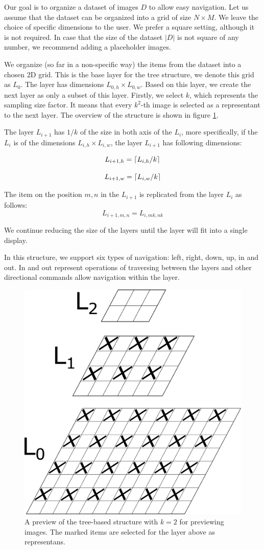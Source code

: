 Our goal is to organize a dataset of images $D$ to allow easy navigation. Let us assume that the dataset can be organized into a grid of size $N\times M$. We leave the choice of specific dimensions to the user. We prefer a square setting, although it is not required. In case that the size of the dataset $|D|$ is not square of any number, we recommend adding a placeholder images.

We organize (so far in a non-specific way) the items from the dataset into a chosen 2D grid. This is the base layer for the tree structure, we denote this grid as $L_0$. The layer has dimensions $L_{0, h}\times L_{0, w}$. Based on this layer, we create the next layer as only a subset of this layer. Firstly, we select $k$, which represents the sampling size factor. It means that every $k^2$-th image is selected as a representant to the next layer. The overview of the structure is shown in figure \ref{fig:tree_structure}. 

The layer $L_{i+1}$ has $1/k$ of the size in both axis of the $L_i$, more specifically, if the $L_i$ is of the dimensions $L_{i,h} \times L_{i,w}$, the layer $L_{i+1}$ has following dimensions:

$$
    L_{i+1, h} = \ceil*{L_{i, h} / k}
$$

$$
    L_{i+1, w} = \ceil*{L_{i, w} / k}
$$


The item on the position $m, n$ in the $L_{i+1}$ is replicated from the layer $L_i$ as follows:
$$
    L_{i+1, m, n} = L_{i, mk, nk} 
$$

We continue reducing the size of the layers until the layer will fit into a single display.

In this structure, we support six types of navigation: left, right, down, up, in and out. In and out represent operations of traversing between the layers and other directional commands allow navigation  within the layer. 

\begin{figure}
    \centering
    \includegraphics[width=0.3\linewidth]{img/tree-structure.pdf}
    \caption{A preview of the tree-based structure with $k = 2$ for previewing images. The marked items are selected for the layer above as representans.}
    \label{fig:tree_structure}
\end{figure}

